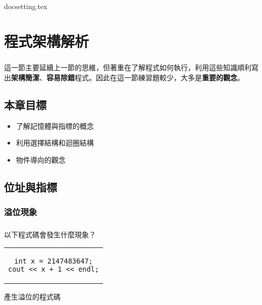 \documentclass[12pt,a4paper,oneside]{report}
\begin{document}
\begin{CJK}{UTF8}{bkai}

{docsetting.tex}
\setcounter{chapter}{1}

\fi


\chapter{程式架構解析}

\paragraph{}這一節主要延續上一節的思維，但著重在了解程式如何執行，利用這些知識順利寫出\textbf{架構簡潔}、\textbf{容易除錯}程式。因此在這一節練習題較少，大多是\textbf{重要的觀念}。

\section*{本章目標}

\begin{itemize}
\item 了解記憶體與指標的概念
\item 利用選擇結構和迴圈結構
\item 物件導向的觀念
\end{itemize}

\section{位址與指標}

\subsection{溢位現象}

\paragraph{}以下程式碼會發生什麼現象？
\begin{code}[h!]
\centering
\begin{tabular}{c}
\begin{lstlisting}
int x = 2147483647;
cout << x + 1 << endl;
\end{lstlisting}
\end{tabular}
\caption{產生溢位的程式碼}
\label{program:struct:code:overflow}
\end{code}


\end{CJK}
\end{document}
